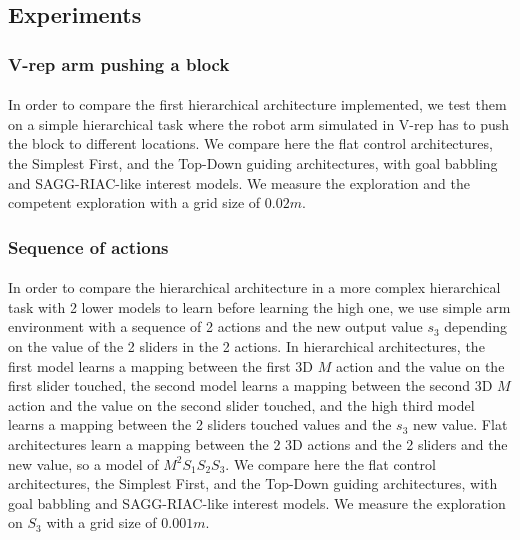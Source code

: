 \documentclass[12pt]{article}
\begin{document}
			
	
	
	\subsection{Experiments}

		\subsubsection{V-rep arm pushing a block}

			\paragraph{}
			In order to compare the first hierarchical architecture implemented, we test them on a simple hierarchical task where the robot arm simulated
			in V-rep has to push the block to different locations.
			We compare here the flat control architectures, the Simplest First, and the Top-Down guiding architectures, with goal babbling and SAGG-RIAC-like
			interest models. We measure the exploration and the competent exploration with a grid size of $0.02m$.


		\subsubsection{Sequence of actions}

			\paragraph{}
			In order to compare the hierarchical architecture in a more complex hierarchical task with 2 lower models to learn before learning the high one, 
			we use simple arm environment with a sequence of 2 actions and the new output value $s_3$ depending on the value of the 2 sliders in the 2 actions.
			In hierarchical architectures, the first model learns a mapping between the first 3D $M$ action and the value on the first slider touched, the
			 second model learns a mapping between the second 3D $M$ action and the value on the second slider touched, and the high third model learns a 
			 mapping between the 2 sliders touched values and the $s_3$ new value.
			Flat architectures learn a mapping between the 2 3D actions and the 2 sliders and the new value, so a model of $M^2S_1S_2S_3$.
			We compare here the flat control architectures, the Simplest First, and the Top-Down guiding architectures, with goal babbling and SAGG-RIAC-like
			interest models. We measure the exploration on $S_3$ with a grid size of $0.001m$.
			
\end{document}
